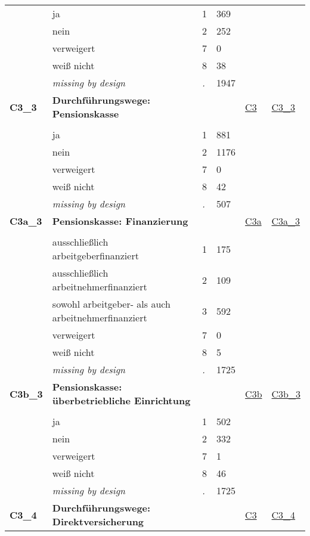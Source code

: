 \begin{longtable}{| L{2.45cm} | L{6cm} | C{1.5cm} | R{1cm} | C{2.25cm} | C{2.25cm} |}
   & ja & 1 & 369 &  &  \\ 
   & nein & 2 & 252 &  &  \\ 
   & verweigert & 7 & 0 &  &  \\ 
   & weiß nicht & 8 & 38 &  &  \\ 
   & \textit{missing by design} & \textit{.} & 1947 &  &  \\ 
   \midrule
\textbf{C3\_3}\label{var:C3:3} & \textbf{Durchführungswege: Pensionskasse} &  &  & \hyperref[C3]{C3} & \hyperref[var:suf:C3:3]{C3\_3} \\ 
   &  &  &  &  &  \\ 
   & ja & 1 & 881 &  &  \\ 
   & nein & 2 & 1176 &  &  \\ 
   & verweigert & 7 & 0 &  &  \\ 
   & weiß nicht & 8 & 42 &  &  \\ 
   & \textit{missing by design} & \textit{.} & 507 &  &  \\ 
   \midrule
\textbf{C3a\_3}\label{var:C3a:3} & \textbf{Pensionskasse: Finanzierung} &  &  & \hyperref[C3a]{C3a} & \hyperref[var:suf:C3a:3]{C3a\_3} \\ 
   &  &  &  &  &  \\ 
   & ausschließlich arbeitgeberfinanziert & 1 & 175 &  &  \\ 
   & ausschließlich arbeitnehmerfinanziert & 2 & 109 &  &  \\ 
   & sowohl arbeitgeber- als auch arbeitnehmerfinanziert & 3 & 592 &  &  \\ 
   & verweigert & 7 & 0 &  &  \\ 
   & weiß nicht & 8 & 5 &  &  \\ 
   & \textit{missing by design} & \textit{.} & 1725 &  &  \\ 
   \midrule
\textbf{C3b\_3}\label{var:C3b:3} & \textbf{Pensionskasse: überbetriebliche Einrichtung} &  &  & \hyperref[C3b]{C3b} & \hyperref[var:suf:C3b:3]{C3b\_3} \\ 
   &  &  &  &  &  \\ 
   & ja & 1 & 502 &  &  \\ 
   & nein & 2 & 332 &  &  \\ 
   & verweigert & 7 & 1 &  &  \\ 
   & weiß nicht & 8 & 46 &  &  \\ 
   & \textit{missing by design} & \textit{.} & 1725 &  &  \\ 
   \midrule
\textbf{C3\_4}\label{var:C3:4} & \textbf{Durchführungswege: Direktversicherung} &  &  & \hyperref[C3]{C3} & \hyperref[var:suf:C3:4]{C3\_4} \\ 

\end{longtable}
